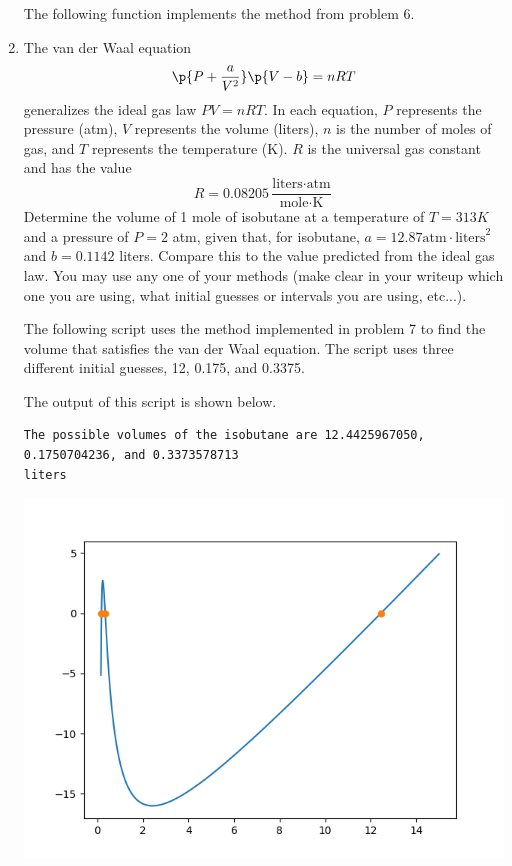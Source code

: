 \documentclass[11pt, oneside]{article}
\begin{document}
\begin{enumerate}
    The following function implements the method from problem 6.
    

  \item %
    The van der Waal equation
    \[
      \p{P + \frac{a}{V^2}}\p{V - b} = nRT
    \]
    generalizes the ideal gas law $PV = nRT$.
    In each equation, $P$ represents the pressure (atm), $V$ represents the volume
    (liters), $n$ is the number of moles of gas, and $T$ represents the temperature
    (K).
    $R$ is the universal gas constant and has the value
    \[
      R = 0.08205 \frac{\text{liters} \cdot \text{atm}}{\text{mole}\cdot \text{K}}
    \]
    Determine the volume of 1 mole of isobutane at a temperature of $T = 313 K$ and
    a pressure of $P = 2$ atm, given that, for isobutane,
    $a = 12.87 \text{atm} \cdot \text{liters}^2$ and $b = 0.1142$ liters.
    Compare this to the value predicted from the ideal gas law.
    You may use any one of your methods (make clear in your writeup which one
    you are using, what initial guesses or intervals you are using, etc...).

    The following script uses the method implemented in problem 7 to find the
    volume that satisfies the van der Waal equation.
    The script uses three different initial guesses, 12, 0.175, and 0.3375.
    

    The output of this script is shown below.
    \begin{verbatim}
The possible volumes of the isobutane are 12.4425967050, 0.1750704236, and 0.3373578713
liters
    \end{verbatim}
    \begin{center}
      \includegraphics[scale=1]{Figures/01_1.png}
    \end{center}


\end{enumerate}
\end{document}
